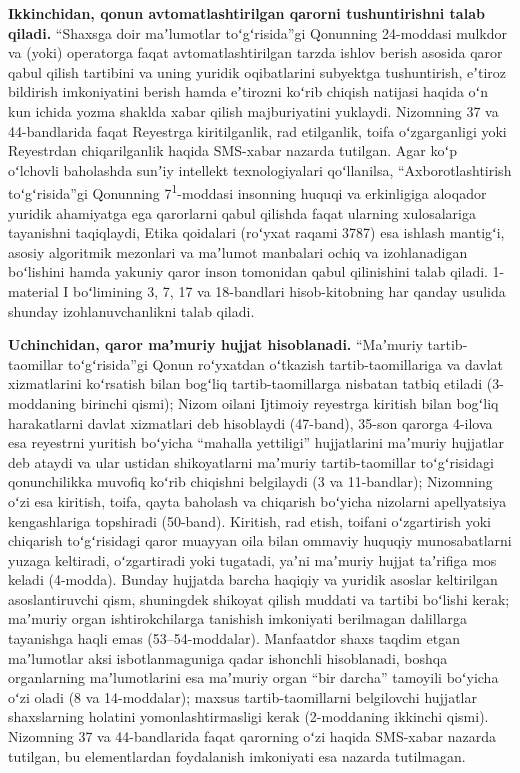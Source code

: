 \documentclass[14pt,a4paper]{extarticle}
\begin{document}
\textbf{Ikkinchidan, qonun avtomatlashtirilgan qarorni tushuntirishni talab qiladi.} “Shaxsga doir maʼlumotlar toʻgʻrisida”gi Qonunning 24-moddasi mulkdor va (yoki) operatorga faqat avtomatlashtirilgan tarzda ishlov berish asosida qaror qabul qilish tartibini va uning yuridik oqibatlarini subyektga tushuntirish, eʼtiroz bildirish imkoniyatini berish hamda eʼtirozni koʻrib chiqish natijasi haqida oʻn kun ichida yozma shaklda xabar qilish majburiyatini yuklaydi\cite{pdlaw}. Nizomning 37 va 44-bandlarida faqat Reyestrga kiritilganlik, rad etilganlik, toifa oʻzgarganligi yoki Reyestrdan chiqarilganlik haqida SMS-xabar nazarda tutilgan\cite{res35}. Agar koʻp oʻlchovli baholashda sunʼiy intellekt texnologiyalari qoʻllanilsa, “Axborotlashtirish toʻgʻrisida”gi Qonunning 7\textsuperscript{1}-moddasi insonning huquqi va erkinligiga aloqador yuridik ahamiyatga ega qarorlarni qabul qilishda faqat ularning xulosalariga tayanishni taqiqlaydi, Etika qoidalari (roʻyxat raqami 3787) esa ishlash mantigʻi, asosiy algoritmik mezonlari va maʼlumot manbalari ochiq va izohlanadigan boʻlishini hamda yakuniy qaror inson tomonidan qabul qilinishini talab qiladi\cite{inform,ethics}. 1-material I boʻlimining 3, 7, 17 va 18-bandlari hisob-kitobning har qanday usulida shunday izohlanuvchanlikni talab qiladi.

\textbf{Uchinchidan, qaror maʼmuriy hujjat hisoblanadi.} “Maʼmuriy tartib-taomillar toʻgʻrisida”gi Qonun roʻyxatdan oʻtkazish tartib-taomillariga va davlat xizmatlarini koʻrsatish bilan bogʻliq tartib-taomillarga nisbatan tatbiq etiladi (3-moddaning birinchi qismi); Nizom oilani Ijtimoiy reyestrga kiritish bilan bogʻliq harakatlarni davlat xizmatlari deb hisoblaydi (47-band), 35-son qarorga 4-ilova esa reyestrni yuritish boʻyicha “mahalla yettiligi” hujjatlarini maʼmuriy hujjatlar deb ataydi va ular ustidan shikoyatlarni maʼmuriy tartib-taomillar toʻgʻrisidagi qonunchilikka muvofiq koʻrib chiqishni belgilaydi (3 va 11-bandlar); Nizomning oʻzi esa kiritish, toifa, qayta baholash va chiqarish boʻyicha nizolarni apellyatsiya kengashlariga topshiradi (50-band)\cite{res35}. Kiritish, rad etish, toifani oʻzgartirish yoki chiqarish toʻgʻrisidagi qaror muayyan oila bilan ommaviy huquqiy munosabatlarni yuzaga keltiradi, oʻzgartiradi yoki tugatadi, yaʼni maʼmuriy hujjat taʼrifiga mos keladi (4-modda). Bunday hujjatda barcha haqiqiy va yuridik asoslar keltirilgan asoslantiruvchi qism, shuningdek shikoyat qilish muddati va tartibi boʻlishi kerak; maʼmuriy organ ishtirokchilarga tanishish imkoniyati berilmagan dalillarga tayanishga haqli emas (53–54-moddalar). Manfaatdor shaxs taqdim etgan maʼlumotlar aksi isbotlanmaguniga qadar ishonchli hisoblanadi, boshqa organlarning maʼlumotlarini esa maʼmuriy organ “bir darcha” tamoyili boʻyicha oʻzi oladi (8 va 14-moddalar); maxsus tartib-taomillarni belgilovchi hujjatlar shaxslarning holatini yomonlashtirmasligi kerak (2-moddaning ikkinchi qismi)\cite{apl}. Nizomning 37 va 44-bandlarida faqat qarorning oʻzi haqida SMS-xabar nazarda tutilgan, bu elementlardan foydalanish imkoniyati esa nazarda tutilmagan.
\end{document}
